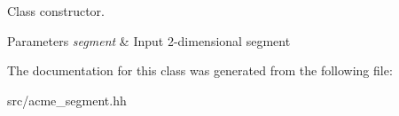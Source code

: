 Class constructor. 


\begin{DoxyParams}{Parameters}
{\em segment} & Input 2-\/dimensional segment \\
\hline
\end{DoxyParams}


The documentation for this class was generated from the following file\+:\begin{DoxyCompactItemize}
\item 
src/acme\+\_\+segment.\+hh\end{DoxyCompactItemize}
